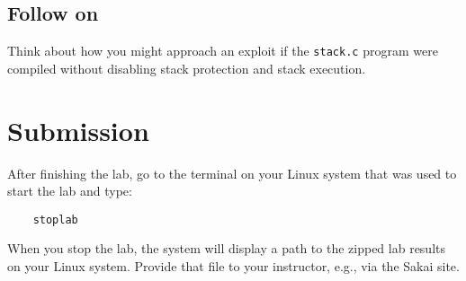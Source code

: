 \subsection{Follow on}
Think about how you might approach an exploit if the {\tt stack.c} program were compiled without disabling stack protection
and stack execution.

\section{Submission}
After finishing the lab, go to the terminal on your Linux system that was used to start the lab and type:
\begin{verbatim}
    stoplab 
\end{verbatim}
When you stop the lab, the system will display a path to the zipped lab results on your Linux system.  Provide that file to 
your instructor, e.g., via the Sakai site.

